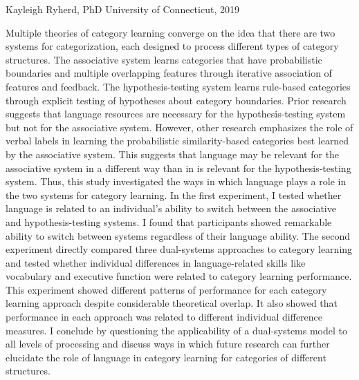 \documentclass[../dissertation.tex]{subfiles}
\begin{document}
\begin{center}
\ptitle
\linebreak
Kayleigh Ryherd, PhD
\linebreak
University of Connecticut, 2019
\end{center}
Multiple theories of category learning converge on the idea that there are two systems for categorization, each designed to process different types of category structures. The associative system learns categories that have probabilistic boundaries and multiple overlapping features through iterative association of features and feedback. The hypothesis-testing system learns rule-based categories through explicit testing of hypotheses about category boundaries. Prior research suggests that language resources are necessary for the hypothesis-testing system but not for the associative system. However, other research emphasizes the role of verbal labels in learning the probabilistic similarity-based categories best learned by the associative system. This suggests that language may be relevant for the associative system in a different way than in is relevant for the hypothesis-testing system. Thus, this study investigated the ways in which language plays a role in the two systems for category learning. In the first experiment, I tested whether language is related to an individual's ability to switch between the associative and hypothesis-testing systems. I found that participants showed remarkable ability to switch between systems regardless of their language ability. The second experiment directly compared three dual-systems approaches to category learning and tested whether individual differences in language-related skills like vocabulary and executive function were related to category learning performance. This experiment showed different patterns of performance for each category learning approach despite considerable theoretical overlap. It also showed that performance in each approach was related to different individual difference measures. I conclude by questioning the applicability of a dual-systems model to all levels of processing and discuss ways in which future research can further elucidate the role of language in category learning for categories of different structures.
\end{document}
